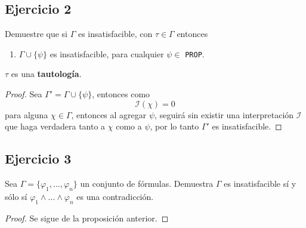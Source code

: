 \documentclass[a4paper]{article}
\begin{document}
\subsection{Ejercicio 2}
Demuestre que si \(\Gamma\) es insatisfacible, con \(\tau \in \Gamma\) entonces
\begin{enumerate}
    \item $\Gamma\cup\{\psi\}$ es insatisfacible, para cualquier \(\psi \in\) \texttt{PROP}.
\end{enumerate}
\(\tau\) es una \textbf{tautología}.
\begin{proof}
    Sea \(\Gamma' = \Gamma \cup \{\psi\}\), entonces
    como 
    \[
        \mathcal{I}\left(\chi\right) = 0
    \]
    para alguna \(\chi \in \Gamma\), entonces al agregar \(\psi\), seguirá sin existir una interpretación
    \(\mathcal{I}\) que haga verdadera tanto a \(\chi\) como a \(\psi\), por lo tanto \(\Gamma'\) es 
    insatisfacible.
\end{proof}
\subsection{Ejercicio 3}
\noindent
Sea $\Gamma=\{\varphi_1,\ldots,\varphi_n\}$ un conjunto de fórmulas. Demuestra $\Gamma$ es insatisfacible sí y sólo sí $\varphi_1\land\ldots\land\varphi_n$ es
una contradicción.
\begin{proof}
    Se sigue de la proposición anterior.
\end{proof}
\end{document}

